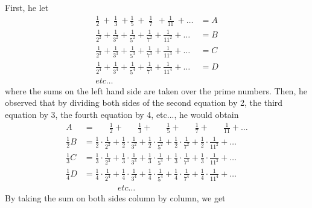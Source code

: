 First, he let 
\begin{align*}
    \frac{1}{2} \ \! + \ \! \frac{1}{3} \ + \frac{1}{5} \ + \; \! \frac{1}{7} \ \ \! \! + \frac{1}{11} \ + \dots &= A \\
    \frac{1}{2^2} + \frac{1}{3^2} + \frac{1}{5^2} + \frac{1}{7^2} + \frac{1}{11^2} + \dots &= B \\
    \frac{1}{2^3} + \frac{1}{3^3} + \frac{1}{5^3} + \frac{1}{7^3} + \frac{1}{11^3} + \dots &= C \\
    \frac{1}{2^4} + \frac{1}{3^4} + \frac{1}{5^4} + \frac{1}{7^4} + \frac{1}{11^4} + \dots &= D \\
    etc\dots \qquad \qquad &
\end{align*}
where the sums on the left hand side are taken over the prime numbers. Then, he observed that by dividing both sides of the second equation by 2, the third equation by 3, the fourth equation by 4, etc..., he would obtain 
\begin{align*}
    A &= \quad \ \ \: \frac{1}{2} + \quad \ \ \: \frac{1}{3} + \quad \ \ \: \frac{1}{5} + \quad \ \ \: \frac{1}{7} + \quad \ \ \: \frac{1}{11} + \dots \\
    \frac{1}{2}B &= \frac{1}{2}\cdot \frac{1}{2^2} + \frac{1}{2}\cdot\frac{1}{3^2} + \frac{1}{2}\cdot\frac{1}{5^2} + \frac{1}{2}\cdot\frac{1}{7^2} + \frac{1}{2}\cdot\frac{1}{11^2} + \dots \\
    \frac{1}{3}C &= \frac{1}{3}\cdot\frac{1}{2^3} + \frac{1}{3}\cdot\frac{1}{3^3} + \frac{1}{3}\cdot\frac{1}{5^3} + \frac{1}{3}\cdot\frac{1}{7^3} + \frac{1}{3}\cdot\frac{1}{11^3} + \dots \\
    \frac{1}{4}D &= \frac{1}{4}\cdot\frac{1}{2^4} + \frac{1}{4}\cdot\frac{1}{3^4} + \frac{1}{4}\cdot\frac{1}{5^4} + \frac{1}{4}\cdot\frac{1}{7^4} + \frac{1}{4}\cdot\frac{1}{11^4} + \dots \\
    & \qquad \qquad etc\dots
\end{align*}
By taking the sum on both sides column by column, we get
